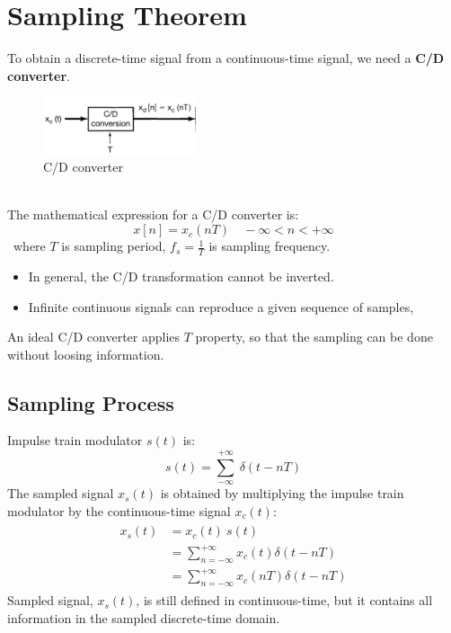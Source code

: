 \documentclass[12pt,a4paper]{article}
\begin{document}
\newpage
\section{Sampling Theorem}

To obtain a discrete-time signal from a continuous-time signal, we need a \textbf{C/D converter}.
 \begin{figure}[H]\centering
 \includegraphics[width = 0.4\textwidth]{images/cdconverter}
 \caption{C/D converter} \end{figure}
 \ \\
The mathematical expression for a C/D converter is:
\[ x[n] = x_{c}(nT) \quad -\infty < n < +\infty \]
\ where $T$ is sampling period, $f_{s} = \frac{1}{T}$ is sampling frequency. 
\begin{itemize}
\item In general, the C/D transformation cannot be inverted.
\item Infinite continuous signals can reproduce a given sequence of samples,
\end{itemize}
An ideal C/D converter applies $T$ property, so that the sampling can be done without loosing information. 

\subsection{Sampling Process}
Impulse train modulator $s(t)$ is: 
\[ s(t) = \sum_{-\infty}^{+\infty} \ \delta(t-nT) \]
The sampled signal $x_{s}(t)$ is obtained by multiplying the impulse train modulator by the continuous-time signal $x_{c}(t)$:
\begin{align*} 
\begin{split}
x_{s}(t) &= x_{c}(t) \ s(t)\\
&= \sum_{n=-\infty}^{+\infty} x_{c}(t) \delta(t-nT)\\
&= \sum_{n=-\infty}^{+\infty} x_{c}(nT) \delta(t-nT)
\end{split}
\end{align*}
Sampled signal, $x_{s}(t)$, is still defined in continuous-time, but it contains all information in the sampled discrete-time domain.\\\\
\end{document}
